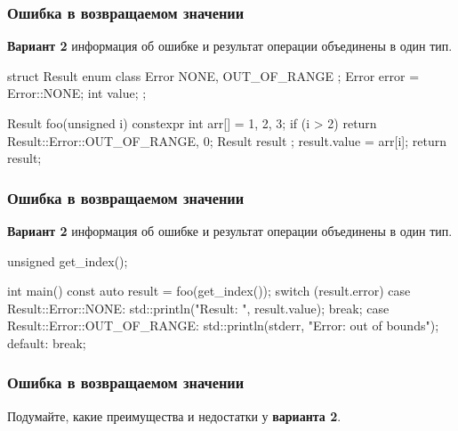 \documentclass[compress, 8pt, aspectratio=169]{beamer}
\begin{document}
  \begin{frame}[fragile]

    \frametitle{Ошибка в возвращаемом значении}

    \textbf{Вариант 2} \textemdash \space информация об ошибке и результат
    операции объединены в один тип.

    \begin{myinplacelisting}[minted language=cpp]
struct Result {
    enum class Error {
        NONE,
        OUT_OF_RANGE
    };
    Error error = Error::NONE;
    int value;
};

Result foo(unsigned i) {
    constexpr int arr[] = {1, 2, 3};
    if (i > 2) {
        return {Result::Error::OUT_OF_RANGE, 0};
    }
    Result result {};
    result.value = arr[i];
    return result;
}
    \end{myinplacelisting}

  \end{frame}

  \begin{frame}[fragile]

    \frametitle{Ошибка в возвращаемом значении}

    \textbf{Вариант 2} \textemdash \space информация об ошибке и результат
    операции объединены в один тип.

    \begin{myinplacelisting}[minted language=cpp]
unsigned get_index();

int main() {
    const auto result = foo(get_index());
    switch (result.error) {
        case Result::Error::NONE:
            std::println("Result: {}", result.value);
            break;
        case Result::Error::OUT_OF_RANGE:
            std::println(stderr,
                "Error: out of bounds");
        default:
            break;
    }
}
    \end{myinplacelisting}

  \end{frame}

  \begin{frame}[fragile]

    \frametitle{Ошибка в возвращаемом значении}

    \begin{task}
      Подумайте, какие преимущества и недостатки у \textbf{варианта 2}.
    \end{task}

  \end{frame}
\end{document}
